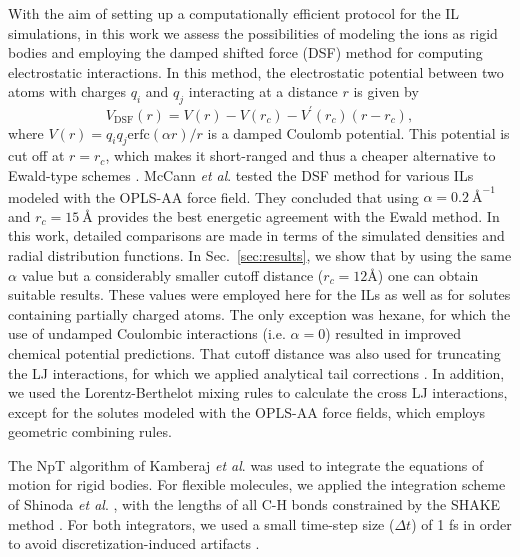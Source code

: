 \documentclass[3p,twocolumn]{elsarticle}
\begin{document}
With the aim of setting up a computationally efficient protocol for the IL simulations, in this work we assess the possibilities of modeling the ions as rigid bodies and employing the damped shifted force (DSF) method \cite{Fennell2006} for computing electrostatic interactions.
In this method, the electrostatic potential between two atoms with charges $q_i$ and $q_j$ interacting at a distance $r$ is given by
\begin{equation}
V_\text{DSF}(r) = V(r) - V(r_c) - V^\prime(r_c)(r-r_c),
\end{equation}
where $V(r) = q_i q_j {\text{erfc}(\alpha r)}/{r}$ is a damped Coulomb potential.
This potential is cut off at $r = r_c$, which makes it short-ranged and thus a cheaper alternative to Ewald-type schemes \cite{Ewald_1921,Darden_1993,Hockney_1988}.
McCann \textit{et al}. \cite{McCann_2013} tested the DSF method for various ILs modeled with the OPLS-AA force field.
They concluded that using $\alpha = 0.2~\text{\AA}^{-1}$ and $r_c = 15~\text{\AA}$ provides the best energetic agreement with the Ewald method.
In this work, detailed comparisons are made in terms of the simulated densities and radial distribution functions.
In Sec.~\ref{sec:results}, we show that by using the same $\alpha$ value but a considerably smaller cutoff distance ($r_c = 12 \text{\AA}$) one can obtain suitable results.
These values were employed here for the ILs as well as for solutes containing partially charged atoms.
The only exception was hexane, for which the use of undamped Coulombic interactions (i.e. $\alpha = 0$) resulted in improved chemical potential predictions. That cutoff distance was also used for truncating the LJ interactions, for which we applied analytical tail corrections \cite{allen}. In addition, we used the Lorentz-Berthelot mixing rules to calculate the cross LJ interactions, except for the solutes modeled with the OPLS-AA force fields, which employs geometric combining rules.

The NpT algorithm of Kamberaj \textit{et al}. \cite{Kamberaj_2005} was used to integrate the equations of motion for rigid bodies.
For flexible molecules, we applied the integration scheme of Shinoda \textit{et al}. \cite{Shinoda2004}, with the lengths of all C-H bonds constrained by the SHAKE method \cite{Ryckaert1977}.
For both integrators, we used a small time-step size ($\Delta t$) of 1 fs in order to avoid discretization-induced artifacts \cite{Eastwood_2010, Silveira_2017}.
\end{document}
